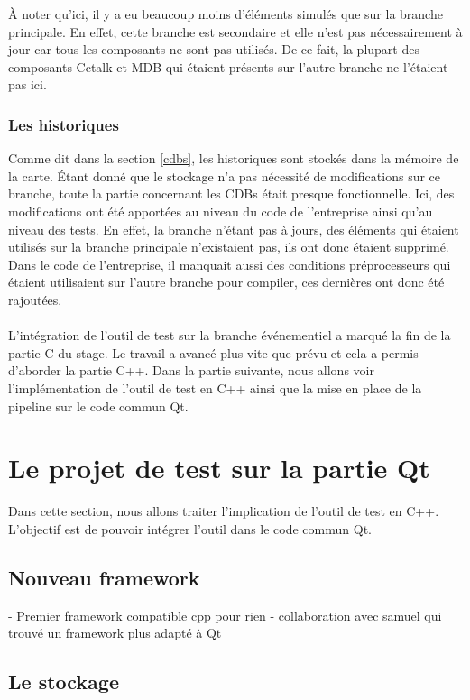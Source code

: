 \documentclass[a4paper]{article}
\begin{document}
À noter qu'ici, il y a eu beaucoup moins d'éléments simulés que sur la branche
principale. En effet, cette branche est secondaire et elle n'est pas
nécessairement à jour car tous les composants ne sont pas utilisés. De ce fait,
la plupart des composants Cctalk et MDB qui étaient présents sur l'autre branche
ne l'étaient pas ici.

\subsubsection*{Les historiques}

Comme dit dans la section \ref{cdbs}, les historiques sont stockés dans la
mémoire de la carte. Étant donné que le stockage n'a pas nécessité de
modifications sur ce branche, toute la partie concernant les CDBs était presque
fonctionnelle. Ici, des modifications ont été apportées au niveau du code de
l'entreprise ainsi qu'au niveau des tests. En effet, la branche n'étant pas à
jours, des éléments qui étaient utilisés sur la branche principale n'existaient
pas, ils ont donc étaient supprimé. Dans le code de l'entreprise, il manquait
aussi des conditions préprocesseurs qui étaient utilisaient sur l'autre branche
pour compiler, ces dernières ont donc été rajoutées.
\\~\\

L'intégration de l'outil de test sur la branche événementiel a marqué la fin de
la partie C du stage. Le travail a avancé plus vite que prévu et cela a permis
d'aborder la partie C++. Dans la partie suivante, nous allons voir
l'implémentation de l'outil de test en C++ ainsi que la mise en place de la
pipeline sur le code commun Qt.
\section{Le projet de test sur la partie Qt}%

Dans cette section, nous allons traiter l'implication de l'outil de test en
C++. L'objectif est de pouvoir intégrer l'outil dans le code commun Qt.

\subsection{Nouveau framework}

- Premier framework compatible cpp pour rien
- collaboration avec samuel qui trouvé un framework plus adapté à Qt

\subsection{Le stockage}
\end{document}
